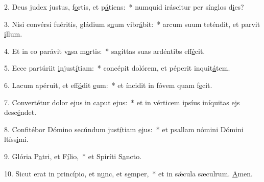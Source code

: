2. Deus judex justus, f\uline{o}rtis, et p\uline{á}tiens:~* numquid iráscitur per sínglos d\uline{i}es?\par 
3. Nisi convérsi fuéritis, gládium s\uline{u}um vibr\uline{á}bit:~* arcum suum teténdit, et parvit \uline{i}llum.\par 
4. Et in eo parávit v\uline{a}sa m\uline{o}rtis:~* sagíttas suas ardéntibs eff\uline{é}cit.\par 
5. Ecce partúriit \uline{i}njust\uline{í}tiam:~* concépit dolórem, et péperit inquit\uline{á}tem.\par 
6. Lacum apéruit, et eff\uline{ó}dit \uline{e}um:~* et íncidit in fóvem quam f\uline{e}cit.\par 
7. Convertétur dolor ejus in c\uline{a}put \uline{e}jus:~* et in vérticem ipsíus iníquitas ejs desc\uline{é}ndet.\par 
8. Confitébor Dómino secúndum just\uline{í}tiam \uline{e}jus:~* et psallam nómini Dómini ltíss\uline{i}mi.\par 
9. Glória P\uline{a}tri, et F\uline{í}lio,~* et Spiríti S\uline{a}ncto.\par 
10. Sicut erat in princípio, et n\uline{u}nc, et s\uline{e}mper,~* et in sǽcula sæculrum. \uline{A}men.\par 

